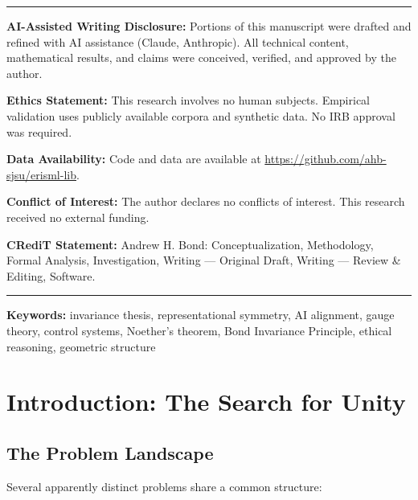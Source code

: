 \documentclass[12pt]{article}
\begin{document}
\begin{titlepage}
\noindent\rule{\linewidth}{0.4pt}
\small
\noindent\textbf{AI-Assisted Writing Disclosure:} Portions of this manuscript were drafted and refined with AI assistance (Claude, Anthropic). All technical content, mathematical results, and claims were conceived, verified, and approved by the author.

\noindent\textbf{Ethics Statement:} This research involves no human subjects. Empirical validation uses publicly available corpora and synthetic data. No IRB approval was required.

\noindent\textbf{Data Availability:} Code and data are available at \url{https://github.com/ahb-sjsu/erisml-lib}.

\noindent\textbf{Conflict of Interest:} The author declares no conflicts of interest. This research received no external funding.

\noindent\textbf{CRediT Statement:} Andrew H. Bond: Conceptualization, Methodology, Formal Analysis, Investigation, Writing --- Original Draft, Writing --- Review \& Editing, Software.
\noindent\rule{\linewidth}{0.4pt}
\normalsize

\end{titlepage}

\noindent\textbf{Keywords:} invariance thesis, representational symmetry, AI alignment, gauge theory, control systems, Noether's theorem, Bond Invariance Principle, ethical reasoning, geometric structure

\tableofcontents

\section{Introduction: The Search for Unity}

\subsection{The Problem Landscape}

Several apparently distinct problems share a common structure:
\end{document}
